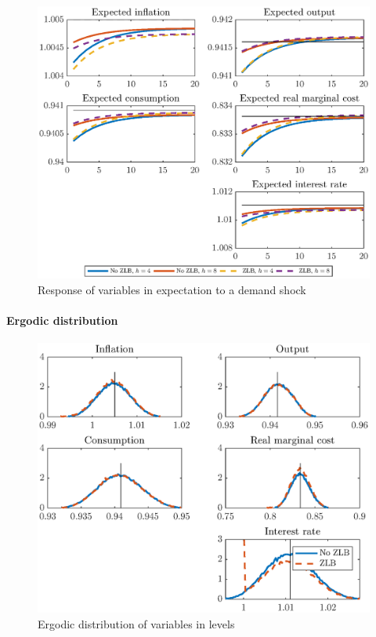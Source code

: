 \documentclass[12pt]{article}
\numberwithin{equation}{section}
\begin{document}
\begin{figure}[H]
	\centering
	\caption{Response of variables in expectation to a demand shock}\label{fig:m2_irfExp_pref}
	\includegraphics[scale=0.7]{m3_irfExp_pref}
\end{figure}

\paragraph{Ergodic distribution}

\begin{figure}[H]
	\centering
	\caption{Ergodic distribution of variables in levels}\label{fig:m3_distLevel}
	\includegraphics[scale=0.7]{m3_distLevel}
\end{figure}
\end{document}
